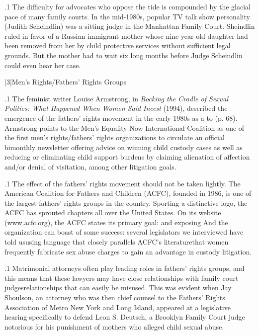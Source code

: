 \documentclass[11pt, twoside]{article}
\begin{document}
{\p.1{%
The difficulty for advocates who oppose the tide is compounded by
the glacial pace of many family courts. In the mid-1980s, popular TV
talk show personality  (Judith Scheindlin) was a sitting
judge in the Manhattan Family Court. Sheindlin ruled in favor of a
Russian immigrant mother whose nine-year-old daughter had been removed from her by child protective services without sufficient legal
grounds. But the mother had to wait six long months before Judge
Scheindlin could even hear her case.
}%


\s|3|{Men’s Rights/Fathers’ Rights Groups}

\p.1{%
\noindent{}The feminist writer Louise Armstrong, in \textit{Rocking the Cradle of Sexual
Politics: What Happened When Women Said Incest} (1994), described
the emergence of the fathers’ rights movement in the early 1980s as a
 to  (p. 68).
Armstrong points to the Men’s Equality Now International Coalition
as one of the first men’s rights/fathers’ rights organizations to circulate
an official bimonthly newsletter offering advice on winning child
custody cases as well as reducing or eliminating child support burdens by
claiming alienation of affection and/or denial of visitation, among other
litigation goals.
}%

\p.1{%
The effect of the fathers’ rights movement should not be taken lightly.
The American Coalition for Fathers and Children (ACFC), founded in
1986, is one of the largest fathers’ rights groups in the country. Sporting a distinctive logo, the ACFC has sprouted chapters all over the
United States. On its website (www.acfc.org), the ACFC states its primary goal:  and
exposing  And the organization can boast of some success: several legislators we interviewed
have told us\mdash{}using language that closely parallels ACFC’s
literature\mdash{}that women frequently fabricate sex abuse charges to gain an advantage
in custody litigation.
}%

\p.1{%
Matrimonial attorneys often play leading roles in fathers’ rights
groups, and this means that these lawyers may have close relationships
with family court judges\mdash{}relationships that can easily be misused. This
was evident when Jay Shoulson, an attorney who was then chief counsel
to the Fathers’ Rights Association of Metro New York and Long Island,
appeared at a legislative hearing specifically to defend Leon S. Deutsch,
a Brooklyn Family Court judge notorious for his punishment of mothers
who alleged child sexual abuse.
}%

}
\end{document}

